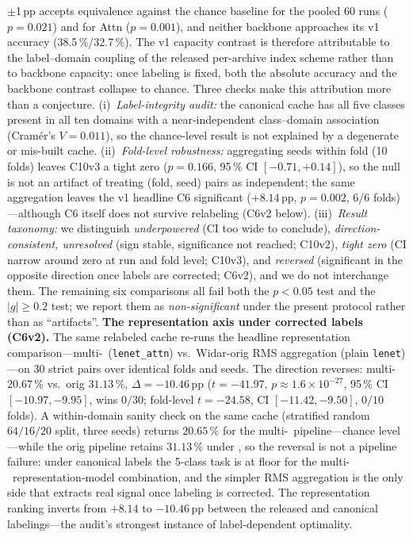 \documentclass[11pt]{article}
\theoremstyle{definition}
\newcommand{\LODO}{\text{LODO}}
\newcommand{\Rx}{\text{Rx}}
\begin{document}
$\pm$1\,pp accepts equivalence against the chance baseline for the pooled 60 runs ($p = 0.021$) and for Attn ($p = 0.001$), and neither backbone approaches its v1 accuracy (38.5\,\%/32.7\,\%). The v1 capacity contrast is therefore attributable to the label--domain coupling of the released per-archive index scheme rather than to backbone capacity: once labeling is fixed, both the absolute accuracy and the backbone contrast collapse to chance. Three checks make this attribution more than a conjecture. (i)~\emph{Label-integrity audit:} the canonical cache has all five classes present in all ten domains with a near-independent class--domain association (Cram\'er's $V = 0.011$), so the chance-level result is not explained by a degenerate or mis-built cache. (ii)~\emph{Fold-level robustness:} aggregating seeds within fold (10 folds) leaves C10v3 a tight zero ($p = 0.166$, 95\,\% CI $[-0.71, +0.14]$), so the null is not an artifact of treating (fold, seed) pairs as independent; the same aggregation leaves the v1 headline C6 significant ($+8.14$\,pp, $p = 0.002$, 6/6 folds)---although C6 itself does not survive relabeling (C6v2 below). (iii)~\emph{Result taxonomy:} we distinguish \emph{underpowered} (CI too wide to conclude), \emph{direction-consistent, unresolved} (sign stable, significance not reached; C10v2), \emph{tight zero} (CI narrow around zero at run and fold level; C10v3), and \emph{reversed} (significant in the opposite direction once labels are corrected; C6v2), and we do not interchange them. The remaining six comparisons all fail both the $p < 0.05$ test and the $|g| \geq 0.2$ test; we report them as \emph{non-significant} under the present protocol rather than as ``artifacts''. \textbf{The representation axis under corrected labels (C6v2).} The same relabeled cache re-runs the headline representation comparison---multi-\Rx\ (\texttt{lenet\_attn}) vs.\ Widar-orig RMS aggregation (plain \texttt{lenet})---on 30 strict pairs over identical folds and seeds. The direction reverses: multi-\Rx\ $20.67\,\%$ vs.\ orig $31.13\,\%$, $\Delta = -10.46$\,pp ($t = -41.97$, $p \approx 1.6\times10^{-27}$, 95\,\% CI $[-10.97, -9.95]$, wins $0/30$; fold-level $t = -24.58$, CI $[-11.42, -9.50]$, $0/10$ folds). A within-domain sanity check on the same cache (stratified random $64/16/20$ split, three seeds) returns $20.65\,\%$ for the multi-\Rx\ pipeline---chance level---while the orig pipeline retains $31.13\,\%$ under \LODO, so the reversal is not a pipeline failure: under canonical labels the 5-class task is at floor for the multi-\Rx\ representation-model combination, and the simpler RMS aggregation is the only side that extracts real signal once labeling is corrected. The representation ranking inverts from $+8.14$ to $-10.46$\,pp between the released and canonical labelings---the audit's strongest instance of label-dependent optimality.
\end{document}
